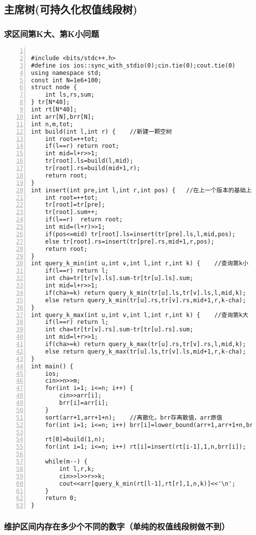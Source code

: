 \subsection{主席树(可持久化权值线段树)}

\subsubsection{求区间第K大、第K小问题}

\begin{lstlisting}[language={[ANSI]C},numbers=left]

#include <bits/stdc++.h>
#define ios ios::sync_with_stdio(0);cin.tie(0);cout.tie(0)
using namespace std;
const int N=1e6+100;
struct node {
	int ls,rs,sum;
} tr[N*40];
int rt[N*40];
int arr[N],brr[N];
int n,m,tot;
int build(int l,int r) {	//新建一颗空树
	int root=++tot;
	if(l==r) return root;
	int mid=l+r>>1;
	tr[root].ls=build(l,mid);
	tr[root].rs=build(mid+1,r);
	return root;
}
int insert(int pre,int l,int r,int pos) {	//在上一个版本的基础上新建一个版本并插入pos值
	int root=++tot;
	tr[root]=tr[pre];
	tr[root].sum++;
	if(l==r)  return root;
	int mid=(l+r)>>1;
	if(pos<=mid) tr[root].ls=insert(tr[pre].ls,l,mid,pos);
	else tr[root].rs=insert(tr[pre].rs,mid+1,r,pos);
	return root;
}
int query_k_min(int u,int v,int l,int r,int k) {	//查询第k小 
	if(l==r) return l;
	int cha=tr[tr[v].ls].sum-tr[tr[u].ls].sum;
	int mid=l+r>>1;
	if(cha>=k) return query_k_min(tr[u].ls,tr[v].ls,l,mid,k);
	else return query_k_min(tr[u].rs,tr[v].rs,mid+1,r,k-cha);
}
int query_k_max(int u,int v,int l,int r,int k) {	//查询第k大 
	if(l==r) return l;
	int cha=tr[tr[v].rs].sum-tr[tr[u].rs].sum;
	int mid=l+r>>1;
	if(cha>=k) return query_k_max(tr[u].rs,tr[v].rs,l,mid,k);
	else return query_k_max(tr[u].ls,tr[v].ls,mid+1,r,k-cha);
}
int main() {
	ios;
	cin>>n>>m;
	for(int i=1; i<=n; i++) {
		cin>>arr[i];
		brr[i]=arr[i];
	}
	sort(arr+1,arr+1+n);	//离散化，brr存离散值，arr原值
	for(int i=1; i<=n; i++) brr[i]=lower_bound(arr+1,arr+1+n,brr[i])-arr;
	
	rt[0]=build(1,n);
	for(int i=1; i<=n; i++) rt[i]=insert(rt[i-1],1,n,brr[i]);
	
	while(m--) {
		int l,r,k;
		cin>>l>>r>>k;
		cout<<arr[query_k_min(rt[l-1],rt[r],1,n,k)]<<'\n';
	}
	return 0;
}
\end{lstlisting}

\subsubsection{维护区间内存在多少个不同的数字（单纯的权值线段树做不到）}


